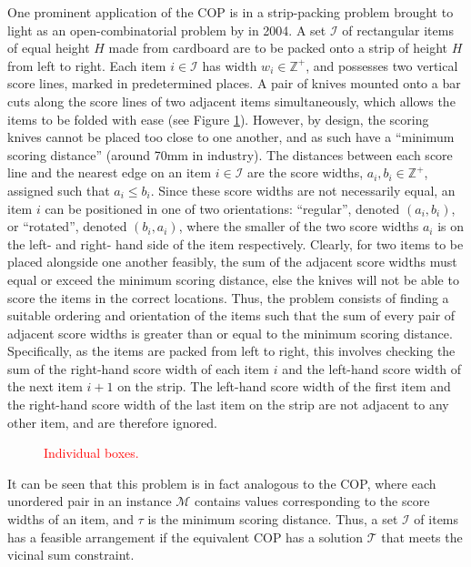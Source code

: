 \documentclass[oribibl]{llncs}
\begin{document}
One prominent application of the COP is in a strip-packing problem brought to light as an open-combinatorial problem by \citeauthor{goulimis2004} in 2004. A set $\mathcal{I}$ of rectangular items of equal height $H$ made from cardboard are to be packed onto a strip of height $H$ from left to right. Each item $i \in \mathcal{I}$ has width $w_i \in \mathbb{Z}^{+}$, and possesses two vertical score lines, marked in predetermined places. A pair of knives mounted onto a bar cuts along the score lines of two adjacent items simultaneously, which allows the items to be folded with ease (see Figure \ref{fig:boxknife}). However, by design, the scoring knives cannot be placed too close to one another, and as such have a ``minimum scoring distance'' (around 70mm in industry). The distances between each score line and the nearest edge on an item $i \in \mathcal{I}$ are the score widths, $a_i, b_i \in \mathbb{Z}^{+}$, assigned such that $a_i \leq b_i$. Since these score widths are not necessarily equal, an item $i$ can be positioned in one of two orientations: ``regular'', denoted $(a_i, b_i)$, or ``rotated'', denoted $(b_i, a_i)$, where the smaller of the two score widths $a_i$ is on the left- and right- hand side of the item respectively. Clearly, for two items to be placed alongside one another feasibly, the sum of the adjacent score widths must equal or exceed the minimum scoring distance, else the knives will not be able to score the items in the correct locations. Thus, the problem consists of finding a suitable ordering and orientation of the items such that the sum of every pair of adjacent score widths is greater than or equal to the minimum scoring distance. Specifically, as the items are packed from left to right, this involves checking the sum of the right-hand score width of each item $i$ and the left-hand score width of the next item $i+1$ on the strip. The left-hand score width of the first item and the right-hand score width of the last item on the strip are not adjacent to any other item, and are therefore ignored. 


\begin{figure}[h!]	
	\centering
	
	\caption{\textcolor{red}{Individual boxes.}}	
	\label{fig:boxknife}
\end{figure}

It can be seen that this problem is in fact analogous to the COP, where each unordered pair in an instance $\mathcal{M}$ contains values corresponding to the score widths of an item, and $\tau$ is the minimum scoring distance. Thus, a set $\mathcal{I}$ of items has a feasible arrangement if the equivalent COP has a solution $\mathcal{T}$ that meets the vicinal sum constraint.
\end{document}
